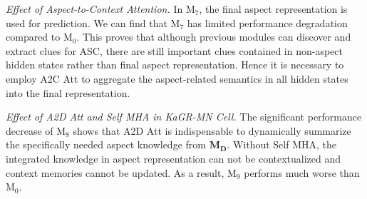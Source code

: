 \textit{Effect of Aspect-to-Context Attention.}
In M$_7$, the final aspect representation is used for prediction.
We can find that M$_7$ has limited performance degradation compared to M$_0$.
This proves that although previous modules can discover and extract clues for ASC, there are still important clues contained in non-aspect hidden states rather than final aspect representation.
Hence it is necessary to employ A2C Att to aggregate the aspect-related semantics in all hidden states into the final representation.

\textit{Effect of A2D Att and Self MHA in KaGR-MN Cell.}
The significant performance decrease of M$_8$ shows that A2D Att is indispensable to dynamically summarize the specifically needed aspect knowledge from $\mathbf {M_D}$.
Without Self MHA, the integrated knowledge in aspect representation can not be contextualized and context memories cannot be updated.
As a result, M$_9$ performs much worse than M$_0$.







